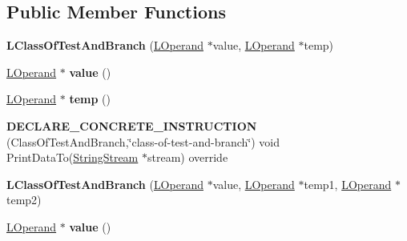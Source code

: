 \subsection*{Public Member Functions}
\begin{DoxyCompactItemize}
\item 
{\bfseries L\+Class\+Of\+Test\+And\+Branch} (\hyperlink{classv8_1_1internal_1_1_l_operand}{L\+Operand} $\ast$value, \hyperlink{classv8_1_1internal_1_1_l_operand}{L\+Operand} $\ast$temp)\hypertarget{classv8_1_1internal_1_1_l_class_of_test_and_branch_a39178393b36ba59838196357be36ab79}{}\label{classv8_1_1internal_1_1_l_class_of_test_and_branch_a39178393b36ba59838196357be36ab79}

\item 
\hyperlink{classv8_1_1internal_1_1_l_operand}{L\+Operand} $\ast$ {\bfseries value} ()\hypertarget{classv8_1_1internal_1_1_l_class_of_test_and_branch_a701d1d88a41fd46c94cc2d33ec5093b6}{}\label{classv8_1_1internal_1_1_l_class_of_test_and_branch_a701d1d88a41fd46c94cc2d33ec5093b6}

\item 
\hyperlink{classv8_1_1internal_1_1_l_operand}{L\+Operand} $\ast$ {\bfseries temp} ()\hypertarget{classv8_1_1internal_1_1_l_class_of_test_and_branch_ad6879400ca43794c61f3e6ac2829ddab}{}\label{classv8_1_1internal_1_1_l_class_of_test_and_branch_ad6879400ca43794c61f3e6ac2829ddab}

\item 
{\bfseries D\+E\+C\+L\+A\+R\+E\+\_\+\+C\+O\+N\+C\+R\+E\+T\+E\+\_\+\+I\+N\+S\+T\+R\+U\+C\+T\+I\+ON} (Class\+Of\+Test\+And\+Branch,\char`\"{}class-\/of-\/test-\/and-\/branch\char`\"{}) void Print\+Data\+To(\hyperlink{classv8_1_1internal_1_1_string_stream}{String\+Stream} $\ast$stream) override\hypertarget{classv8_1_1internal_1_1_l_class_of_test_and_branch_a029c33ea762efee5c0e2f13b702a3b6f}{}\label{classv8_1_1internal_1_1_l_class_of_test_and_branch_a029c33ea762efee5c0e2f13b702a3b6f}

\item 
{\bfseries L\+Class\+Of\+Test\+And\+Branch} (\hyperlink{classv8_1_1internal_1_1_l_operand}{L\+Operand} $\ast$value, \hyperlink{classv8_1_1internal_1_1_l_operand}{L\+Operand} $\ast$temp1, \hyperlink{classv8_1_1internal_1_1_l_operand}{L\+Operand} $\ast$temp2)\hypertarget{classv8_1_1internal_1_1_l_class_of_test_and_branch_ae865906fe31b7f155c17a9ec1a387867}{}\label{classv8_1_1internal_1_1_l_class_of_test_and_branch_ae865906fe31b7f155c17a9ec1a387867}

\item 
\hyperlink{classv8_1_1internal_1_1_l_operand}{L\+Operand} $\ast$ {\bfseries value} ()\hypertarget{classv8_1_1internal_1_1_l_class_of_test_and_branch_a701d1d88a41fd46c94cc2d33ec5093b6}{}\label{classv8_1_1internal_1_1_l_class_of_test_and_branch_a701d1d88a41fd46c94cc2d33ec5093b6}


\end{DoxyCompactItemize}
